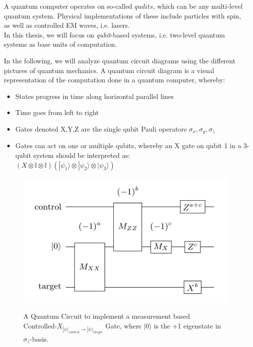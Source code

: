 A quantum computer operates on so-called $qudits$, which can be
any multi-level quantum system. 
Physical implementations of these include particles with 
spin, as well as controlled EM waves, i.e. lasers. \\
In this thesis, we will
focus on \emph{qubit}-based systems, i.e. two-level quantum systems as base 
units of computation.

In the following, we will analyze quantum circuit diagrams using the different
pictures of quantum mechanics.
A quantum circuit diagram is a visual representation of the computation done
in a quantum computer, whereby:
\begin{itemize}
	\item States progress in time along horizontal parallel lines
	\item Time goes from left to right
	\item Gates denoted X,Y,Z are the single qubit Pauli operators
		$\sigma_x,\sigma_y,\sigma_z$
	\item Gates can act on one or multiple qubits, whereby an X gate 
		on qubit 1 in a 3-qubit system should be interpreted as:
		\\$(X\otimes \mathbb{I} \otimes \mathbb{I}) (|\psi_1\rangle
		\otimes |\psi_2\rangle \otimes |\psi_3\rangle)$
\end{itemize}
\begin{figure}[h!]
	\begin{center}
	\captionsetup{justification=centering,margin=2cm}
	\includegraphics[scale=0.4]{img/figures/cnotMeasureCircuit.png}\\
	\caption{A Quantum Circuit to implement a measurement based\\
		Controlled-$X_{|\psi\rangle_{control}\rightarrow |\psi\rangle_{target}}$ Gate,
		where $|0\rangle$ is the +1 eigenstate in $\sigma_{z}$-basis.}
	\label{fig:circuit1}
	\end{center}
\end{figure}

\newpage
